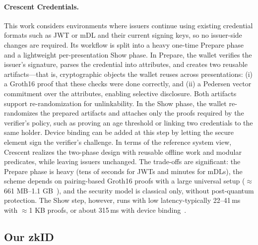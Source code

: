 \paragraph{Crescent Credentials.~\cite{cryptoeprint:2024/2013}}
This work considers environments where issuers continue using existing credential formats such as JWT or mDL and their current signing keys, so no issuer-side changes are required.
Its workflow is split into a heavy one-time Prepare phase and a lightweight per-presentation Show phase.
In Prepare, the wallet verifies the issuer’s signature, parses the credential into attributes, and creates two reusable artifacts---that is, cryptographic objects the wallet reuses across presentations: (i) a Groth16 proof that these checks were done correctly, and (ii) a Pedersen vector commitment over the attributes, enabling selective disclosure.
Both artifacts support re-randomization for unlinkability.
In the Show phase, the wallet re-randomizes the prepared artifacts and attaches only the proofs required by the verifier’s policy, such as proving an age threshold or linking two credentials to the same holder. Device binding can be added at this step by letting the secure element sign the verifier’s challenge.
In terms of the reference system view, Crescent realizes the two-phase design with reusable offline work and modular predicates, while leaving issuers unchanged. The trade-offs are significant: the Prepare phase is heavy (tens of seconds for JWTs and minutes for mDLs), the scheme depends on pairing-based Groth16 proofs with a large universal setup ($\approx$ 661 MB–1.1 GB~\cite[\S4]{cryptoeprint:2024/2013}), and the security model is classical only, without post-quantum protection. The Show step, however, runs with low latency-typically 22–41\,ms with $\approx$1 KB proofs, or about 315\,ms with device binding~\cite[\S4]{cryptoeprint:2024/2013}.

\subsection{Our zkID}

